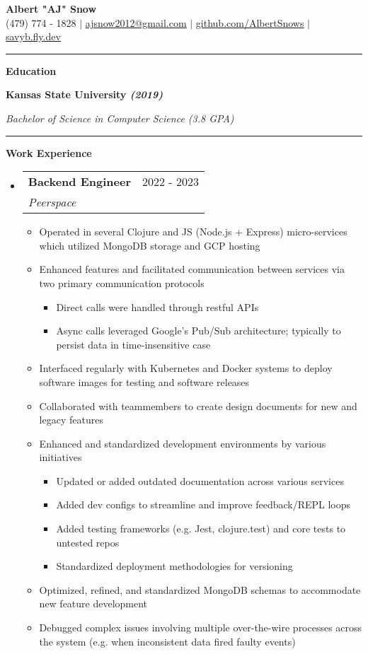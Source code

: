 \documentclass[letterpaper,11pt]{article}
\makeatletter
\newcommand{\resumeItem}[1]{
  \item\small{
    {#1 \vspace{-2pt}}
  }
}
\newcommand{\resumeSubheading}[4]{
  \vspace{-2pt}\item
    \begin{tabular*}{0.97\textwidth}[t]{l@{\extracolsep{\fill}}r}
      \textbf{#1} & #2 \\
      \textit{\small#3} & \textit{\small #4} \\
    \end{tabular*}\vspace{0pt}
}
\newcommand{\resumeSubHeadingListStart}{\begin{itemize}[leftmargin=0.15cm, label={}]}
\newcommand{\resumeSubHeadingListEnd}{\end{itemize}}
\newcommand{\resumeItemListStart}{\begin{itemize}}
\newcommand{\resumeItemListEnd}{\end{itemize}\vspace{-5pt}}
\makeatother
\begin{document}
\textbf{\normalshape \Large \textcolor{magic_blue}{Albert "AJ" Snow}} \\ \vspace{3pt}
\small (479) 774 - 1828 $|$ \href{mailto:ajsnow2012@gmail.com}
{\underline{ajsnow2012@gmail.com}} $|$
\href{https://github.com/AlbertSnows}{\underline{github.com/AlbertSnows}}
$|$ \href{https://savyb.fly.dev/}{\underline{savyb.fly.dev}}
\noindent\rule{19.5cm}{0.4pt}

\textbf{\large \textcolor{magic_blue}{Education}}

\begin{minipage}[t]{0.45\textwidth}
	\raggedright
	\textbf{ Kansas State University \textit{(2019)}} \\
\end{minipage}
\hfill
\begin{minipage}[t]{0.45\textwidth}
	\raggedleft
	\textit{Bachelor of Science in Computer Science (3.8 GPA)} \\
\end{minipage}
\noindent\rule{19.5cm}{0.4pt}

\textbf{\large \textcolor{magic_blue}{Work Experience}}
\resumeSubHeadingListStart
\resumeSubheading
{Backend Engineer}{2022 - 2023}
{Peerspace}{}
\resumeItemListStart
\resumeItem{Operated in several Clojure and JS (Node.js + Express) micro-services which utilized MongoDB storage and GCP hosting}
\resumeItem{Enhanced features and facilitated communication between services via two primary communication protocols}
\begin{itemize}
	\item Direct calls were handled through restful APIs
	\item Async calls leveraged Google's Pub/Sub architecture; typically to persist data in time-insensitive case
\end{itemize}
\resumeItem{Interfaced regularly with Kubernetes and Docker systems to deploy software images for testing and software releases}
\resumeItem{Collaborated with teammembers to create design documents for new and legacy features}
\resumeItem{Enhanced and standardized development environments by various initiatives}
\begin{itemize}
	\item Updated or added outdated documentation across various services
	\item Added dev configs to streamline and improve feedback/REPL loops
	\item Added testing frameworks (e.g. Jest, clojure.test) and core tests to untested repos
	\item Standardized deployment methodologies for versioning
\end{itemize}
\resumeItem{Optimized, refined, and standardized MongoDB schemas to accommodate new feature development}
\resumeItem{Debugged complex issues involving multiple over-the-wire processes across the system (e.g. when inconsistent data fired faulty events) }
\resumeItemListEnd
\resumeSubHeadingListEnd
\end{document}
